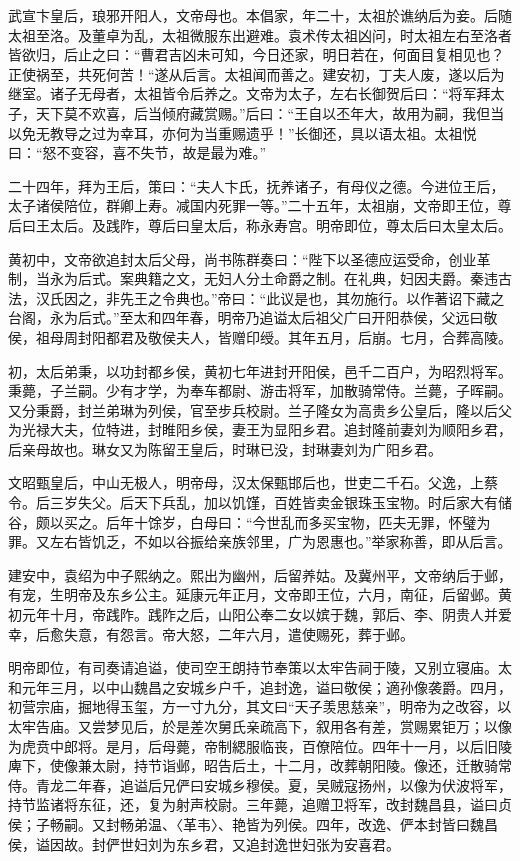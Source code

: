 \documentclass[12pt,UTF8]{ctexbook}
\begin{document}
武宣卞皇后，琅邪开阳人，文帝母也。本倡家，年二十，太祖於谯纳后为妾。后随太祖至洛。及董卓为乱，太祖微服东出避难。袁术传太祖凶问，时太祖左右至洛者皆欲归，后止之曰：“曹君吉凶未可知，今日还家，明日若在，何面目复相见也？正使祸至，共死何苦！“遂从后言。太祖闻而善之。建安初，丁夫人废，遂以后为继室。诸子无母者，太祖皆令后养之。文帝为太子，左右长御贺后曰：“将军拜太子，天下莫不欢喜，后当倾府藏赏赐。”后曰：“王自以丕年大，故用为嗣，我但当以免无教导之过为幸耳，亦何为当重赐遗乎！”长御还，具以语太祖。太祖悦曰：“怒不变容，喜不失节，故是最为难。”

二十四年，拜为王后，策曰：“夫人卞氏，抚养诸子，有母仪之德。今进位王后，太子诸侯陪位，群卿上寿。减国内死罪一等。”二十五年，太祖崩，文帝即王位，尊后曰王太后。及践阼，尊后曰皇太后，称永寿宫。明帝即位，尊太后曰太皇太后。

黄初中，文帝欲追封太后父母，尚书陈群奏曰：“陛下以圣德应运受命，创业革制，当永为后式。案典籍之文，无妇人分土命爵之制。在礼典，妇因夫爵。秦违古法，汉氏因之，非先王之令典也。”帝曰：“此议是也，其勿施行。以作著诏下藏之台阁，永为后式。”至太和四年春，明帝乃追谥太后祖父广曰开阳恭侯，父远曰敬侯，祖母周封阳都君及敬侯夫人，皆赠印绶。其年五月，后崩。七月，合葬高陵。

初，太后弟秉，以功封都乡侯，黄初七年进封开阳侯，邑千二百户，为昭烈将军。秉薨，子兰嗣。少有才学，为奉车都尉、游击将军，加散骑常侍。兰薨，子晖嗣。又分秉爵，封兰弟琳为列侯，官至步兵校尉。兰子隆女为高贵乡公皇后，隆以后父为光禄大夫，位特进，封睢阳乡侯，妻王为显阳乡君。追封隆前妻刘为顺阳乡君，后亲母故也。琳女又为陈留王皇后，时琳已没，封琳妻刘为广阳乡君。

文昭甄皇后，中山无极人，明帝母，汉太保甄邯后也，世吏二千石。父逸，上蔡令。后三岁失父。后天下兵乱，加以饥馑，百姓皆卖金银珠玉宝物。时后家大有储谷，颇以买之。后年十馀岁，白母曰：“今世乱而多买宝物，匹夫无罪，怀璧为罪。又左右皆饥乏，不如以谷振给亲族邻里，广为恩惠也。”举家称善，即从后言。

建安中，袁绍为中子熙纳之。熙出为幽州，后留养姑。及冀州平，文帝纳后于邺，有宠，生明帝及东乡公主。延康元年正月，文帝即王位，六月，南征，后留邺。黄初元年十月，帝践阼。践阼之后，山阳公奉二女以嫔于魏，郭后、李、阴贵人并爱幸，后愈失意，有怨言。帝大怒，二年六月，遣使赐死，葬于邺。

明帝即位，有司奏请追谥，使司空王朗持节奉策以太牢告祠于陵，又别立寝庙。太和元年三月，以中山魏昌之安城乡户千，追封逸，谥曰敬侯；適孙像袭爵。四月，初营宗庙，掘地得玉玺，方一寸九分，其文曰“天子羡思慈亲”，明帝为之改容，以太牢告庙。又尝梦见后，於是差次舅氏亲疏高下，叙用各有差，赏赐累钜万；以像为虎贲中郎将。是月，后母薨，帝制緦服临丧，百僚陪位。四年十一月，以后旧陵庳下，使像兼太尉，持节诣邺，昭告后土，十二月，改葬朝阳陵。像还，迁散骑常侍。青龙二年春，追谥后兄俨曰安城乡穆侯。夏，吴贼寇扬州，以像为伏波将军，持节监诸将东征，还，复为射声校尉。三年薨，追赠卫将军，改封魏昌县，谥曰贞侯；子畅嗣。又封畅弟温、〈革韦〉、艳皆为列侯。四年，改逸、俨本封皆曰魏昌侯，谥因故。封俨世妇刘为东乡君，又追封逸世妇张为安喜君。
\end{document}
